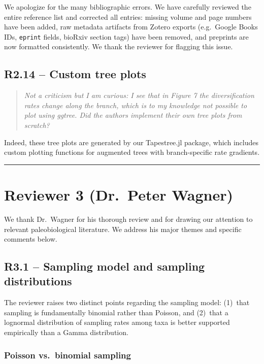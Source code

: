 \documentclass[11pt]{article}
\newenvironment{RC}{\begin{quote}\itshape}{\end{quote}}
\newcommand{\response}[1]{\noindent\textcolor{resp}{#1}\medskip}
\begin{document}
\response{We apologize for the many bibliographic errors. We have carefully reviewed the entire reference list and corrected all entries: missing volume and page numbers have been added, raw metadata artifacts from Zotero exports (e.g.\ Google Books IDs, \texttt{eprint} fields, bioRxiv section tags) have been removed, and preprints are now formatted consistently. We thank the reviewer for flagging this issue.}

\subsection*{R2.14 -- Custom tree plots}

\begin{RC}
Not a criticism but I am curious: I see that in Figure 7 the diversification rates change along the branch, which is to my knowledge not possible to plot using ggtree. Did the authors implement their own tree plots from scratch?
\end{RC}

\response{Indeed, these tree plots are generated by our Tapestree.jl package, which includes custom plotting functions for augmented trees with branch-specific rate gradients.}


\bigskip\noindent\rule{\linewidth}{0.8pt}\bigskip

\section*{Reviewer 3 (Dr.\ Peter Wagner)}

We thank Dr.\ Wagner for his thorough review and for drawing our attention to relevant paleobiological literature. We address his major themes and specific comments below.

\subsection*{R3.1 -- Sampling model and sampling distributions}

The reviewer raises two distinct points regarding the sampling model: (1)~that sampling is fundamentally binomial rather than Poisson, and (2)~that a lognormal distribution of sampling rates among taxa is better supported empirically than a Gamma distribution.

\subsubsection*{Poisson vs.\ binomial sampling}
\end{document}
